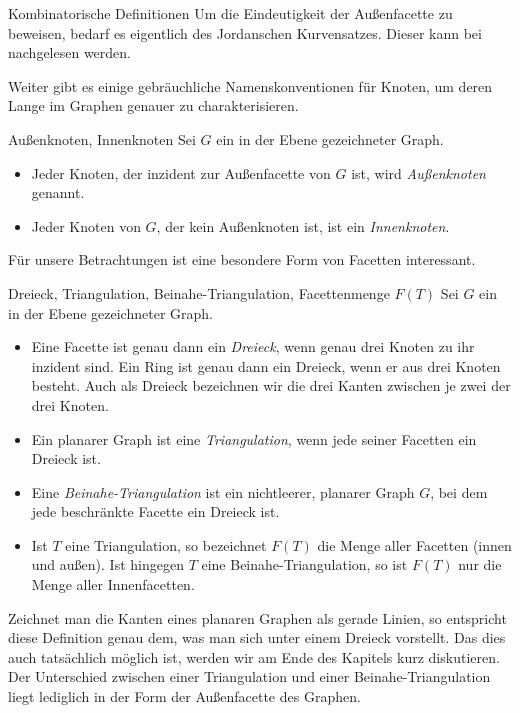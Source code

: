\begin{section}{Kombinatorische Definitionen}
  Um die Eindeutigkeit der Außenfacette zu beweisen, bedarf es eigentlich des Jordanschen Kurvensatzes. Dieser kann bei \cite[Seite 53]{fritsch} nachgelesen werden.
  
  Weiter gibt es einige gebräuchliche Namenskonventionen für Knoten, um deren Lange im Graphen genauer zu charakterisieren.
  
  \begin{definition}{Außenknoten, Innenknoten}
   Sei $G$ ein in der Ebene gezeichneter Graph.
   \begin{itemize}
    \item Jeder Knoten, der inzident zur Außenfacette von $G$ ist, wird \textit{Außenknoten} genannt.
    \item Jeder Knoten von $G$, der kein Außenknoten ist, ist ein \textit{Innenknoten}.
   \end{itemize}

  \end{definition}

  Für unsere Betrachtungen ist eine besondere Form von Facetten interessant. 
  
  \begin{definition}{Dreieck, Triangulation, Beinahe-Triangulation, Facettenmenge $F(T)$}
   Sei $G$ ein in der Ebene gezeichneter Graph.
   \begin{itemize}
   \item Eine Facette ist genau dann ein \textit{Dreieck}, wenn genau drei Knoten zu ihr inzident sind. Ein Ring ist genau dann ein Dreieck, wenn er aus drei Knoten besteht. Auch als Dreieck bezeichnen wir die drei Kanten zwischen je zwei der drei Knoten.
   \item Ein planarer Graph ist eine \textit{Triangulation}, wenn jede seiner Facetten ein Dreieck ist. 
   \item Eine \textit{Beinahe-Triangulation} ist ein nichtleerer, planarer Graph $G$, bei dem jede beschränkte Facette ein Dreieck ist. 
   \item Ist $T$ eine Triangulation, so bezeichnet $F(T)$ die Menge aller Facetten (innen und außen). Ist hingegen $T$ eine Beinahe-Triangulation, so ist $F(T)$ nur die Menge aller Innenfacetten.
   \end{itemize}
  \end{definition}
  
  Zeichnet man die Kanten eines planaren Graphen als gerade Linien, so entspricht diese Definition genau dem, was man sich unter einem Dreieck vorstellt. Das dies auch tatsächlich möglich ist, werden wir am Ende des Kapitels kurz diskutieren. Der Unterschied zwischen einer Triangulation und einer Beinahe-Triangulation liegt lediglich in der Form der Außenfacette des Graphen. 
 

\end{section}
